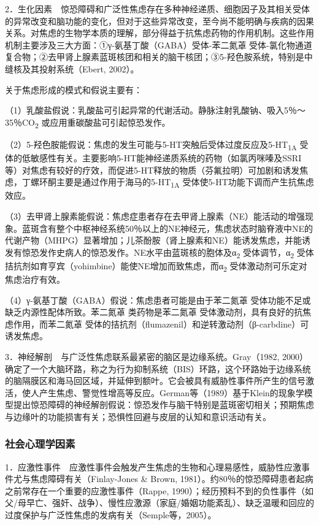 2．生化因素　惊恐障碍和广泛性焦虑存在多种神经递质、细胞因子及其相关受体的异常改变和脑功能的变化，但对于这些异常改变，至今尚不能明确与疾病的因果关系。对焦虑的生物学本质的理解，部分得益于抗焦虑药物的作用机制。这些作用机制主要涉及三大方面：①γ-氨基丁酸（GABA）受体-苯二氮䓬
受体-氯化物通道复合物；②去甲肾上腺素蓝斑核团和相关的脑干核团；③5-羟色胺系统，特别是中缝核及其投射系统（Ebert,
2002）。

关于焦虑形成的模式和假说主要有：

（1）乳酸盐假说：乳酸盐可引起异常的代谢活动。静脉注射乳酸钠、吸入5％～35％CO\textsubscript{2}
或应用重碳酸盐可引起惊恐发作。

（2）5-羟色胺能假说：焦虑的发生可能与5-HT突触后受体过度反应及5-HT\textsubscript{1A}
受体的低敏感性有关。主要影响5-HT能神经递质系统的药物（如氯丙咪嗪及SSRI等）对焦虑有较好的疗效，而促进5-HT释放的物质（芬氟拉明）可加剧和诱发焦虑，丁螺环酮主要是通过作用于海马的5-HT\textsubscript{1A}
受体使5-HT功能下调而产生抗焦虑效应。

（3）去甲肾上腺素能假说：焦虑症患者存在去甲肾上腺素（NE）能活动的增强现象。蓝斑含有整个中枢神经系统50％以上的NE神经元，焦虑状态时脑脊液中NE的代谢产物（MHPG）显著增加；儿茶酚胺（肾上腺素和NE）能诱发焦虑，并能诱发有惊恐发作史病人的惊恐发作。NE水平由蓝斑核的胞体及α\textsubscript{2}
受体调节，α\textsubscript{2}
受体拮抗剂如育亨宾（yohimbine）能使NE增加而致焦虑，而α\textsubscript{2}
受体激动剂可乐定对焦虑治疗有效。

（4）γ-氨基丁酸（GABA）假说：焦虑患者可能是由于苯二氮䓬
受体功能不足或缺乏内源性配体所致。苯二氮䓬
类药物是苯二氮䓬
受体激动剂，具有良好的抗焦虑作用，而苯二氮䓬
受体的拮抗剂（flumazenil）和逆转激动剂（β-carbdine）可诱发焦虑。

3．神经解剖　与广泛性焦虑联系最紧密的脑区是边缘系统。Gray（1982,
2000）确定了一个大脑环路，称之为行为抑制系统（BIS）环路，这个环路始于边缘系统的脑隔膜区和海马回区域，并延伸到额叶。它会被具有威胁性事件所产生的信号激活，使人产生焦虑、警觉性增高等反应。German等（1989）基于Klein的现象学模型提出惊恐障碍的神经解剖假说：惊恐发作与脑干特别是蓝斑密切相关；预期焦虑与边缘叶的功能损害有关；恐惧性回避与皮层的认知和意识活动有关。

\subsubsection{社会心理学因素}

1．应激性事件　应激性事件会触发产生焦虑的生物和心理易感性，威胁性应激事件尤与焦虑障碍有关（Finlay-Jones
\& Brown,
1981）。约80％的惊恐障碍患者起病之前常存在一个重要的应激性事件（Rappe,
1990）；经历预料不到的负性事件（如父/母早亡、强奸、战争）、慢性应激源（家庭/婚姻功能紊乱）、缺乏温暖和回应的过度保护与广泛性焦虑的发病有关（Semple等，2005）。

